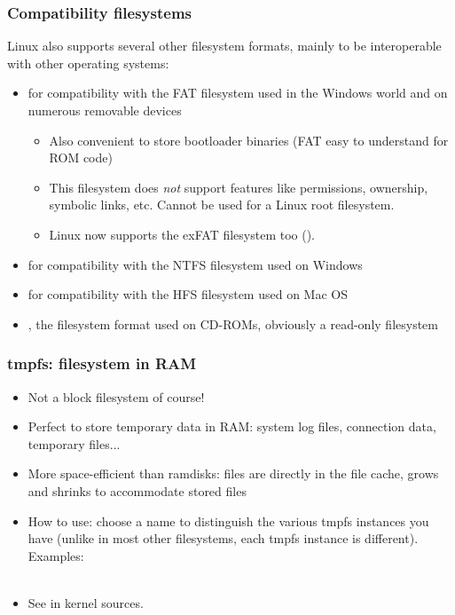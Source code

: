\begin{frame}
  \frametitle{Compatibility filesystems}
  Linux also supports several other filesystem formats, mainly to be
  interoperable with other operating systems:
  \begin{itemize}
  \item {} for compatibility with the FAT filesystem used in
    the Windows world and on numerous removable devices
    \begin{itemize}
    \item Also convenient to store bootloader binaries (FAT easy
      to understand for ROM code)
    \item This filesystem does {\em not} support features like
      permissions, ownership, symbolic links, etc. Cannot be used for
      a Linux root filesystem.
    \item Linux now supports the exFAT filesystem too ().
    \end{itemize}
  \item {} for compatibility with the NTFS filesystem used on
    Windows
  \item {} for compatibility with the HFS filesystem used on
    Mac OS
  \item {}, the filesystem format used on CD-ROMs,
    obviously a read-only filesystem
  \end{itemize}
\end{frame}

\begin{frame}
  \frametitle{tmpfs: filesystem in RAM}
  \begin{itemize}
  \item Not a block filesystem of course!
  \item Perfect to store temporary data in RAM: system log files,
    connection data, temporary files...
  \item More space-efficient than ramdisks: files are directly in the
    file cache, grows and shrinks to accommodate stored files
  \item How to use: choose a name to distinguish the various tmpfs
    instances you have (unlike in most other filesystems, each
    tmpfs instance is different). Examples:\\
    \\
  \item See  in kernel sources.
  \end{itemize}
\end{frame}

